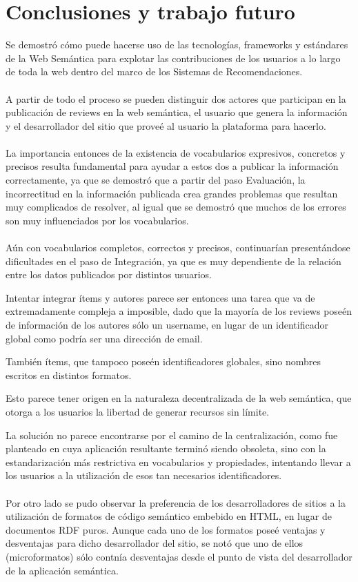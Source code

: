 \chapter{Conclusiones y trabajo futuro}
\label{chapter:conclusiones}

Se demostró cómo puede hacerse uso de las tecnologías, frameworks y estándares de la Web 
Semántica para explotar las contribuciones de los usuarios a lo largo de toda la web dentro 
del marco de los Sistemas de Recomendaciones.
\\\\
A partir de todo el proceso se pueden distinguir dos actores que participan en la publicación 
de reviews en la web semántica, el usuario que genera la información y el desarrollador
del sitio que proveé al usuario la plataforma para hacerlo.
\\\\
La importancia entonces de la existencia de vocabularios expresivos, concretos y precisos 
resulta fundamental para ayudar a estos dos a publicar la información correctamente, ya que 
se demostró que a partir del paso Evaluación, la incorrectitud en la información publicada 
crea grandes problemas que resultan muy complicados de resolver, al igual que se demostró 
que muchos de los errores son muy influenciados por los vocabularios.
\\\\
Aún con vocabularios completos, correctos y precisos, continuarían presentándose dificultades en 
el paso de Integración, ya que es muy dependiente de la relación entre los datos publicados 
por distintos usuarios.

Intentar integrar ítems y autores parece ser entonces una tarea que va de extremadamente compleja 
a imposible, dado que la mayoría de los reviews poseén de información de los autores sólo un username, 
en lugar de un identificador global como podría ser una dirección de email.

También ítems, que tampoco poseén identificadores globales, sino nombres escritos en 
distintos formatos.

Esto parece tener origen en la naturaleza decentralizada de la web semántica, que otorga 
a los usuarios la libertad de generar recursos sin límite.

La solución no parece encontrarse por el camino de la centralización, como fue planteado en \cite{Heath2006J} cuya
aplicación resultante terminó siendo obsoleta,
sino con la estandarización más restrictiva en vocabularios y propiedades, intentando 
llevar a los usuarios a la utilización de esos tan necesarios identificadores.
\\\\
Por otro lado se pudo observar la preferencia de los desarrolladores de sitios a la utilización de 
formatos de código semántico embebido en HTML, en lugar de documentos RDF puros. Aunque cada uno de 
los formatos poseé ventajas y desventajas para dicho desarrollador del sitio, se notó que uno de ellos 
(microformatos) sólo contnía desventajas desde el punto de vista del desarrollador de la aplicación 
semántica. 

